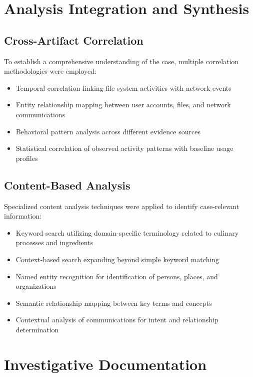 \section{Analysis Integration and Synthesis}

\subsection{Cross-Artifact Correlation}
To establish a comprehensive understanding of the case, multiple correlation methodologies were employed:
\begin{itemize}
    \item Temporal correlation linking file system activities with network events
    \item Entity relationship mapping between user accounts, files, and network communications
    \item Behavioral pattern analysis across different evidence sources
    \item Statistical correlation of observed activity patterns with baseline usage profiles
\end{itemize}

\subsection{Content-Based Analysis}
Specialized content analysis techniques were applied to identify case-relevant information:
\begin{itemize}
    \item Keyword search utilizing domain-specific terminology related to culinary processes and ingredients
    \item Context-based search expanding beyond simple keyword matching
    \item Named entity recognition for identification of persons, places, and organizations
    \item Semantic relationship mapping between key terms and concepts
    \item Contextual analysis of communications for intent and relationship determination
\end{itemize}

\section{Investigative Documentation}

